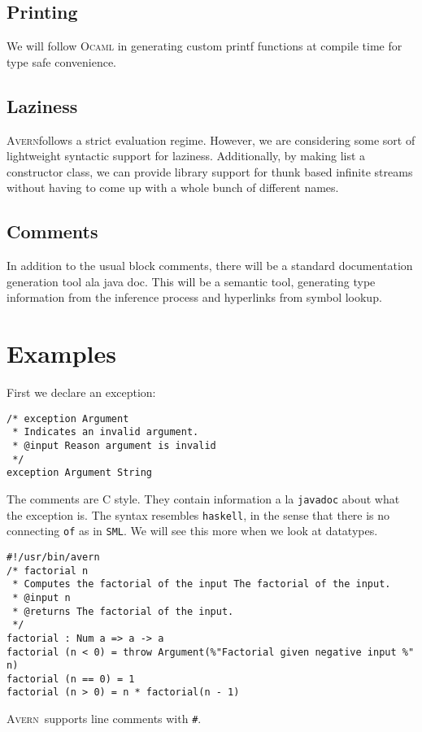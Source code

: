 \documentclass[]{article}
\newcommand{\avern}{\textsc{Avern}}
\begin{document}
\subsection{Printing}
We will follow \textsc{Ocaml} in generating custom printf functions at compile time for type safe convenience.

\subsection{Laziness}
\avern follows a strict evaluation regime. However, we are considering some sort of lightweight syntactic support for laziness. Additionally, by making list a constructor class, we can provide library support for thunk based infinite streams without having to come up with a whole bunch of different names.

\subsection{Comments}
In addition to the usual block comments, there will be a standard documentation generation tool ala java doc. This will be a semantic tool, generating type information from the inference process and hyperlinks from symbol lookup.

\section{Examples}
First we declare an exception:

\begin{verbatim}
/* exception Argument
 * Indicates an invalid argument.
 * @input Reason argument is invalid
 */
exception Argument String
\end{verbatim}

The comments are C style. They contain information a la \texttt{javadoc} about what the exception is. The syntax resembles \texttt{haskell}, in the sense that there is no connecting \texttt{of} as in \texttt{SML}. We will see this more when we look at datatypes.
\begin{verbatim}
#!/usr/bin/avern
/* factorial n 
 * Computes the factorial of the input The factorial of the input.
 * @input n
 * @returns The factorial of the input.
 */
factorial : Num a => a -> a
factorial (n < 0) = throw Argument(%"Factorial given negative input %" n)
factorial (n == 0) = 1
factorial (n > 0) = n * factorial(n - 1)

\end{verbatim}
\avern\ supports line comments with \texttt{\#}.
\end{document}
